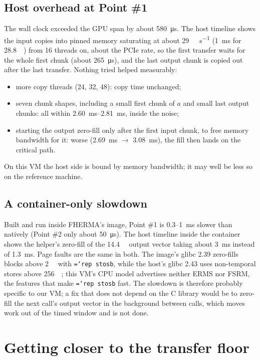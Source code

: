 \documentclass[11pt,a4paper]{article}
\newcommand{\code}[1]{\texttt{\hyphenchar\font=`\-\relax #1}}
\newcommand{\us}[1]{\SI{#1}{\micro\second}}
\newcommand{\ms}[1]{\SI{#1}{\milli\second}}
\newcommand{\MB}[1]{\SI{#1}{\mega\byte}}
\begin{document}
\subsection{Host overhead at Point \#1}
The wall clock exceeded the GPU span by about \us{580}. The host timeline shows the input
copies into pinned memory saturating at about \SI{29}{\giga\byte\per\second} (\ms{1} for
\MB{28.8}) from 16 threads on, about the PCIe rate, so the first transfer waits for the
whole first chunk (about \us{265}), and the last output chunk is copied out after the last
transfer. Nothing tried helped measurably:
\begin{itemize}[leftmargin=*]
\item more copy threads (24, 32, 48): copy time unchanged;
\item seven chunk shapes, including a small first chunk of $a$ and small last output
  chunks: all within \ms{2.60}--\ms{2.81}, inside the noise;
\item starting the output zero-fill only after the first input chunk, to free memory
  bandwidth for it: worse (\ms{2.69} $\to$ \ms{3.08}), the fill then lands on the critical path.
\end{itemize}
On this VM the host side is bound by memory bandwidth; it may well be less so on the
reference machine.

\subsection{A container-only slowdown}
Built and run inside FHERMA's image, Point \#1 is 0.3--\ms{1} slower than natively (Point
\#2 only about \us{50}). The host timeline inside the container shows the helper's zero-fill
of the \MB{14.4} output vector taking about \ms{3} instead of \ms{1.3}. Page faults are the
same in both. The image's glibc 2.39 zero-fills blocks above \SI{2}{\kilo\byte} with
\code{rep stosb}, while the host's glibc 2.43 uses non-temporal stores above
\SI{256}{\kilo\byte}; this VM's CPU model advertises neither ERMS nor FSRM, the features
that make \code{rep stosb} fast. The slowdown is therefore probably specific to our VM;
a fix that does not depend on the C library would be to zero-fill the next call's output
vector in the background between calls, which moves work out of the timed window and is
not done.

\section{Getting closer to the transfer floor}
\end{document}
